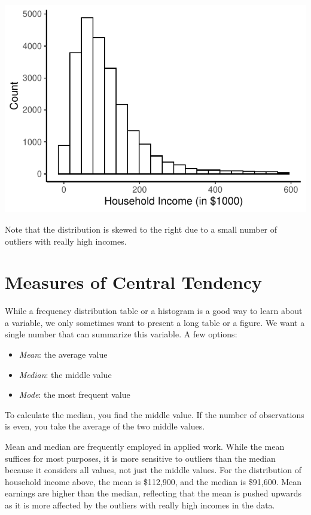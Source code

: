 \documentclass{./../../Latex/handout}
\begin{document}
\includegraphics{./../../Output/hhi_hist.pdf}

Note that the distribution is skewed to the right due to a small number of outliers with really high incomes. 

\section{Measures of Central Tendency}

While a frequency distribution table or a histogram is a good way to learn about a variable, we only sometimes want to present a long table or a figure. We want a single number that can summarize this variable. A few options:
\begin{itemize}
\item[] \textit{{Mean}}:  the average value
\item[] \textit{{Median}}: the middle value 
\item[] \textit{{Mode}}: the most frequent value
\end{itemize} 

To calculate the median, you find the middle value. If the number of observations is even, you take the average of the two middle values. 

Mean and median are frequently employed in applied work. While the mean suffices for most purposes, it is more sensitive to outliers than the median because it considers all values, not just the middle values. For the distribution of household income above, the mean is \$112,900, and the median is \$91,600. Mean earnings are higher than the median, reflecting that the mean is pushed upwards as it is more affected by the outliers with really high incomes in the data. 
\end{document}
